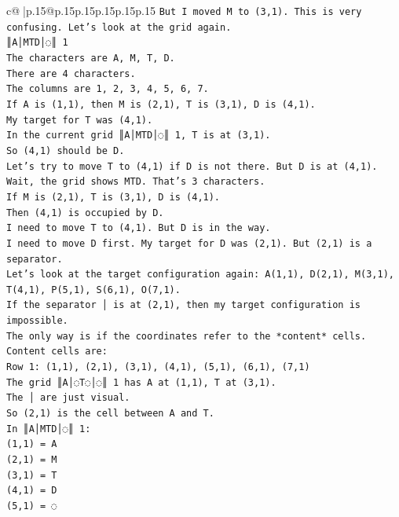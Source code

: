 \documentclass{article}
\begin{document}
{\begin{supertabular}{c@{$\;$}|p{.15\linewidth}@{}p{.15\linewidth}p{.15\linewidth}p{.15\linewidth}p{.15\linewidth}p{.15\linewidth}}
{{{\texttt{But I moved M to (3,1). This is very confusing. Let's look at the grid again.} \\
\texttt{║A│MTD│◌║ 1} \\
\texttt{The characters are A, M, T, D.} \\
\texttt{There are 4 characters.} \\
\texttt{The columns are 1, 2, 3, 4, 5, 6, 7.} \\
\texttt{If A is (1,1), then M is (2,1), T is (3,1), D is (4,1).} \\
\texttt{My target for T was (4,1).} \\
\texttt{In the current grid ║A│MTD│◌║ 1, T is at (3,1).} \\
\texttt{So (4,1) should be D.} \\
\texttt{Let's try to move T to (4,1) if D is not there. But D is at (4,1).} \\
\texttt{Wait, the grid shows MTD. That's 3 characters.} \\
\texttt{If M is (2,1), T is (3,1), D is (4,1).} \\
\texttt{Then (4,1) is occupied by D.} \\
\texttt{I need to move T to (4,1). But D is in the way.} \\
\texttt{I need to move D first. My target for D was (2,1). But (2,1) is a separator.} \\
\texttt{Let's look at the target configuration again: A(1,1), D(2,1), M(3,1), T(4,1), P(5,1), S(6,1), O(7,1).} \\
\texttt{If the separator │ is at (2,1), then my target configuration is impossible.} \\
\texttt{The only way is if the coordinates refer to the *content* cells.} \\
\texttt{Content cells are:} \\
\texttt{Row 1: (1,1), (2,1), (3,1), (4,1), (5,1), (6,1), (7,1)} \\
\texttt{The grid ║A│◌T◌│◌║ 1 has A at (1,1), T at (3,1).} \\
\texttt{The │ are just visual.} \\
\texttt{So (2,1) is the cell between A and T.} \\
\texttt{In ║A│MTD│◌║ 1:} \\
\texttt{(1,1) = A} \\
\texttt{(2,1) = M} \\
\texttt{(3,1) = T} \\
\texttt{(4,1) = D} \\
\texttt{(5,1) = ◌} \\
}}}
\end{supertabular}}
\end{document}
